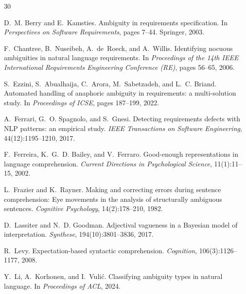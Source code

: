 \documentclass[11pt,twocolumn]{article}
\begin{document}
\begin{thebibliography}{30}

D.~M. Berry and E.~Kamsties.
\newblock Ambiguity in requirements specification.
\newblock In \emph{Perspectives on Software Requirements}, pages 7--44. Springer, 2003.

F.~Chantree, B.~Nuseibeh, A.~de~Roeck, and A.~Willis.
\newblock Identifying nocuous ambiguities in natural language requirements.
\newblock In \emph{Proceedings of the 14th IEEE International Requirements Engineering Conference (RE)}, pages 56--65, 2006.

S.~Ezzini, S.~Abualhaija, C.~Arora, M.~Sabetzadeh, and L.~C. Briand.
\newblock Automated handling of anaphoric ambiguity in requirements: a multi-solution study.
\newblock In \emph{Proceedings of ICSE}, pages 187--199, 2022.

A.~Ferrari, G.~O. Spagnolo, and S.~Gnesi.
\newblock Detecting requirements defects with {NLP} patterns: an empirical study.
\newblock \emph{IEEE Transactions on Software Engineering}, 44(12):1195--1210, 2017.

F.~Ferreira, K.~G.~D. Bailey, and V.~Ferraro.
\newblock Good-enough representations in language comprehension.
\newblock \emph{Current Directions in Psychological Science}, 11(1):11--15, 2002.

L.~Frazier and K.~Rayner.
\newblock Making and correcting errors during sentence comprehension: Eye movements in the analysis of structurally ambiguous sentences.
\newblock \emph{Cognitive Psychology}, 14(2):178--210, 1982.

D.~Lassiter and N.~D. Goodman.
\newblock Adjectival vagueness in a {B}ayesian model of interpretation.
\newblock \emph{Synthese}, 194(10):3801--3836, 2017.

R.~Levy.
\newblock Expectation-based syntactic comprehension.
\newblock \emph{Cognition}, 106(3):1126--1177, 2008.

Y.~Li, A.~Korhonen, and I.~Vuli{\'c}.
\newblock Classifying ambiguity types in natural language.
\newblock In \emph{Proceedings of ACL}, 2024.


\end{thebibliography}
\end{document}
